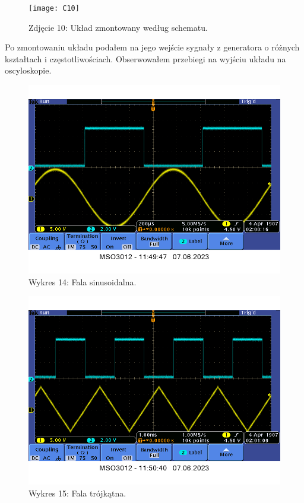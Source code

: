 \documentclass[14pt, table]{extarticle}
\begin{document}
\begin{figure}[H]
\texttt{[image: C10]}
\centering
\captionsetup{labelformat=empty}
\caption{Zdjęcie 10: Układ zmontowany według schematu.}
\end{figure}

\newpage
Po zmontowaniu układu podałem na jego wejście sygnały z generatora o różnych kształtach i częstotliwościach. Obserwowałem przebiegi na wyjściu układu na oscyloskopie.

\begin{figure}[H]
\includegraphics[width=12cm]{A20}
\centering
\captionsetup{labelformat=empty}
\caption{Wykres 14: Fala sinusoidalna.}
\end{figure}

\begin{figure}[H]
\includegraphics[width=12cm]{A21}
\centering
\captionsetup{labelformat=empty}
\caption{Wykres 15: Fala trójkątna.}
\end{figure}
\end{document}
